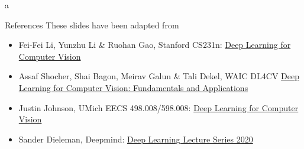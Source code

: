 a\documentclass[10pt]{beamer}
\theoremstyle{remark}
\theoremstyle{definition}
\begin{document}











\begin{frame}{References}
These slides have been adapted from
\begin{itemize}
    \item Fei-Fei Li, Yunzhu Li \& Ruohan Gao, Stanford CS231n: \href{http://cs231n.stanford.edu/index.html}{Deep Learning for Computer Vision}
    \item Assaf Shocher, Shai Bagon, Meirav Galun \& Tali Dekel, WAIC DL4CV \href{https://dl4cv.github.io/index.html}{Deep Learning for Computer Vision: Fundamentals and Applications}
    \item Justin Johnson, UMich EECS 498.008/598.008: \href{https://web.eecs.umich.edu/~justincj/teaching/eecs498/WI2022/}{Deep Learning for Computer Vision}
    \item Sander Dieleman, Deepmind: \href{https://www.deepmind.com/learning-resources/deep-learning-lecture-series-2020}{Deep Learning Lecture Series 2020}
\end{itemize}

\end{frame}
\end{document}

